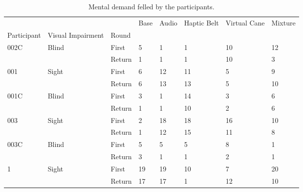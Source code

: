 
\begin{table}[!htb]
\centering
\caption{Mental demand felled by the participants.}
\label{tab:md_table}
\begin{tabular}{llllllll}
\toprule
  &       &        & Base & Audio & Haptic Belt & Virtual Cane & Mixture \\
Participant & Visual Impairment & Round &      &       &             &              &         \\
\midrule
002C & Blind & First &    5 &     1 &           1 &           10 &      12 \\
  &       & Return &    1 &     1 &           1 &           10 &       3 \\
001 & Sight & First &    6 &    12 &          11 &            5 &       9 \\
  &       & Return &    6 &    13 &          13 &            5 &      10 \\
001C & Blind & First &    3 &     1 &          14 &            3 &       6 \\
  &       & Return &    1 &     1 &          10 &            2 &       6 \\
003 & Sight & First &    2 &    18 &          18 &           16 &      10 \\
  &       & Return &    1 &    12 &          15 &           11 &       8 \\
003C & Blind & First &    5 &     5 &           5 &            8 &       1 \\
  &       & Return &    3 &     1 &           1 &            2 &       1 \\
1 & Sight & First &   19 &    19 &          10 &            7 &      20 \\
  &       & Return &   17 &    17 &           1 &           12 &      10 \\
\bottomrule
\end{tabular}
\end{table}

